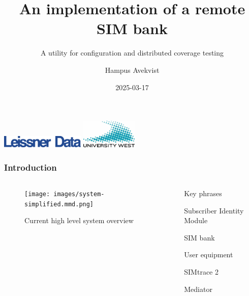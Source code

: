 \documentclass[10pt]{beamer}
\title{An implementation of a remote SIM bank}
\subtitle{A utility for configuration and distributed coverage testing}
\author{Hampus Avekvist}
\institute{University West}
\date{2025-03-17}
\renewcommand{\section}[1]{\frametitle{#1}}
\begin{document}
    \begin{frame}
        \includegraphics[width=0.3\textwidth, left]{images/logo-leissner-data.png}
        \titlepage
        \includegraphics[width=0.2\textwidth, right]{images/university-west-logo.jpg}
    \end{frame}

    \begin{frame}
		\section{Introduction}
		\pause

		\begin{columns}
			\begin{column}{0.5\textwidth}
				\begin{figure}
					\texttt{[image: images/system-simplified.mmd.png]}
					\caption{Current high level system overview}
				\end{figure}
			\end{column}
			\begin{column}{0.5\textwidth}
				\pause
				Key phrases
				\begin{description}
					\pause
					\item[SIM] Subscriber Identity Module
					\pause
					\item SIM bank
					\pause
					\item[UE] User equipment
					\pause
					\item SIMtrace 2
					\pause
					\item Mediator
				\end{description}
			\end{column}
		\end{columns}
    \end{frame}
\end{document}
